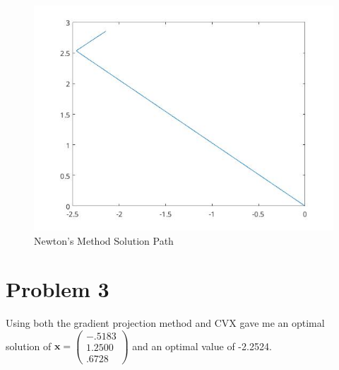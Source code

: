 \documentclass{article}
\begin{document}
\begin{figure}[H] %
  \centering
  \includegraphics[angle=0,totalheight=50mm]{P2graph.jpg}
  \caption{Newton's Method Solution Path}
  \label{fig:tabl}
\end{figure}

\section{Problem 3}

Using both the gradient projection method and CVX gave me an optimal solution of $\mathbf{x} = \left( \begin{array}{cc} -.5183\\1.2500\\.6728 \end{array} \right)$ and an optimal value of -2.2524.
\end{document}
